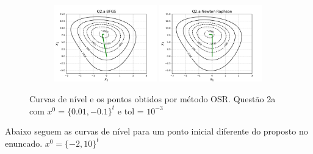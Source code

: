 \documentclass[10pt, a4paper]{article}
\begin{document}
\begin{figure}[H]
\begin{subfigure}[b]{\textwidth}
  \end{subfigure}
  \begin{subfigure}[b]{\textwidth}
    \includegraphics[width=0.49\textwidth]{figuras/Q2.a_BFGS_P0=[0.01e-0.1].pdf}
    \includegraphics[width=0.49\textwidth]{figuras/Q2.a_Newton Raphson_P0=[0.01e-0.1].pdf}
  \end{subfigure}
  \caption{Curvas de nível e os pontos obtidos por método OSR. Questão 2a com $x^0 = \{0.01,-0.1\}^t$ e tol = $10^{-3}$}
\end{figure}

Abaixo seguem as curvas de nível para um ponto inicial diferente do proposto no enuncado. $x^0 = \{-2,10\}^t$
\end{document}
